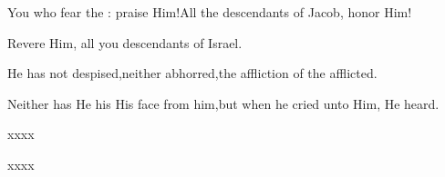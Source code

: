 \begin{inparaenum}
  \pc{} You who fear the \lord: praise Him!\pa{}All the descendants of Jacob, honor Him!%

  \pd{}Revere Him, all you descendants of Israel.%

  \pc{} He has not despised,\pa{}neither abhorred,\pa{}the affliction of the afflicted.%

  \pd{}Neither has He his His face from him,\pa{}but when he cried unto Him, He heard.%

  \pc{} %

  \pc{} %

  \pd{}%

  \pd{} %

  \pd{}%

  \pc{} \smallskip%

  \pa{} %

  \pa{}xxxx \pa{} %

  \pa{}xxxx \pa{} %
\end{inparaenum}

